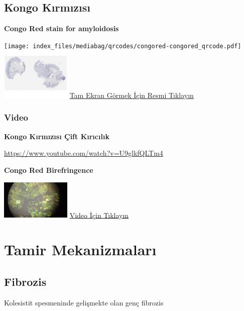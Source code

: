 \documentclass[
  letterpaper,
  DIV=11,
  numbers=noendperiod]{scrreprt}
\begin{document}
\section{Kongo Kırmızısı}\label{sec-amiloidoz-kongo-kirmizisi}

\textbf{Congo Red stain for amyloidosis}

\texttt{[image: index\_files/mediabag/qrcodes/congored-congored\_qrcode.pdf]}
\href{https://images.patolojiatlasi.com/congored/congored.html}{\includegraphics[width=0.25\textwidth,height=\textheight]{./screenshots/thumbnail_congored.png}}
\href{https://images.patolojiatlasi.com/congored/congored.html}{Tam
Ekran Görmek İçin Resmi Tıklayın}

\subsection{Video}\label{video}

\textbf{Kongo Kırmızısı Çift Kırıcılık}

\url{https://www.youtube.com/watch?v=U9glkfQLTm4}

\textbf{Congo Red Birefringence}

\href{https://www.youtube.com/watch?v=U9glkfQLTm4}{\includegraphics[width=0.25\textwidth,height=\textheight]{./screenshots/thumbnail_congored_video.png}}
\href{https://www.youtube.com/watch?v=U9glkfQLTm4}{Video İçin Tıklayın}

\chapter{Tamir Mekanizmaları}\label{sec-tamir-mekanizmalari}

\section{Fibrozis}\label{sec-fibrozis}

Kolesistit spesmeninde gelişmekte olan genç fibrozis
\end{document}
